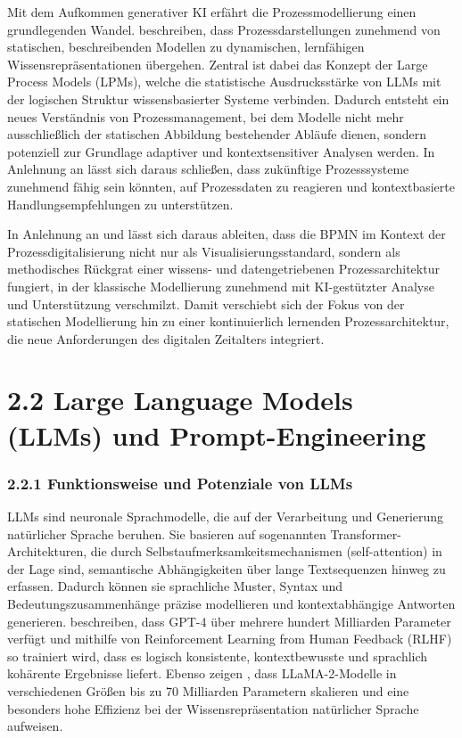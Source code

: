 \documentclass[a4paper,12pt]{scrreprt}
\begin{document}
Mit dem Aufkommen generativer \ac{KI} erfährt die Prozessmodellierung einen grundlegenden Wandel. 
\citet[S.~81--85]{KampikWarmuthRebmannLeiteKirchner2025} beschreiben, dass Prozessdarstellungen zunehmend von statischen, beschreibenden Modellen zu dynamischen, lernfähigen Wissensrepräsentationen übergehen. 
Zentral ist dabei das Konzept der Large Process Models (LPMs), welche die statistische Ausdrucksstärke von \acp{LLM} mit der logischen Struktur wissensbasierter Systeme verbinden. 
Dadurch entsteht ein neues Verständnis von Prozessmanagement, bei dem Modelle nicht mehr ausschließlich der statischen Abbildung bestehender Abläufe dienen, sondern potenziell zur Grundlage adaptiver und kontextsensitiver Analysen werden. 
In Anlehnung an \citet{KampikWarmuthRebmannLeiteKirchner2025} lässt sich daraus schließen, dass zukünftige Prozesssysteme zunehmend fähig sein könnten, auf Prozessdaten zu reagieren und kontextbasierte Handlungsempfehlungen zu unterstützen.

In Anlehnung an \citet{ElstermannEtAl2023} und \citet{KampikWarmuthRebmannLeiteKirchner2025} lässt sich daraus ableiten, dass die \ac{BPMN} im Kontext der Prozessdigitalisierung nicht nur als Visualisierungsstandard, sondern als methodisches Rückgrat einer wissens- und datengetriebenen Prozessarchitektur fungiert, in der klassische Modellierung zunehmend mit \ac{KI}-gestützter Analyse und Unterstützung verschmilzt. 
Damit verschiebt sich der Fokus von der statischen Modellierung hin zu einer kontinuierlich lernenden Prozessarchitektur, die neue Anforderungen des digitalen Zeitalters integriert.

\section*{2.2 Large Language Models (LLMs) und Prompt-Engineering}

\subsubsection*{2.2.1 Funktionsweise und Potenziale von LLMs}

\acp{LLM} sind neuronale Sprachmodelle, die auf der Verarbeitung und Generierung natürlicher Sprache beruhen. 
Sie basieren auf sogenannten Transformer-Architekturen, die durch Selbstaufmerksamkeitsmechanismen (self-attention) in der Lage sind, semantische Abhängigkeiten über lange Textsequenzen hinweg zu erfassen. 
Dadurch können sie sprachliche Muster, Syntax und Bedeutungszusammenhänge präzise modellieren und kontextabhängige Antworten generieren. 
\citet{OpenAI2023} beschreiben, dass GPT-4 über mehrere hundert Milliarden Parameter verfügt und mithilfe von Reinforcement Learning from Human Feedback (RLHF) so trainiert wird, dass es logisch konsistente, kontextbewusste und sprachlich kohärente Ergebnisse liefert. 
Ebenso zeigen \citet{Touvron2023}, dass LLaMA-2-Modelle in verschiedenen Größen bis zu 70 Milliarden Parametern skalieren und eine besonders hohe Effizienz bei der Wissensrepräsentation natürlicher Sprache aufweisen.
\end{document}
